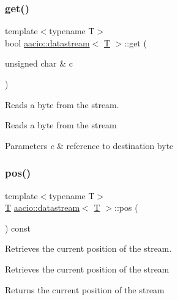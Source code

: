 \subsubsection{\texorpdfstring{get()}{get()}}
{\footnotesize\ttfamily template$<$typename T$>$ \\
bool \mbox{\hyperlink{classaacio_1_1datastream}{aacio\+::datastream}}$<$ \mbox{\hyperlink{struct_t}{T}} $>$\+::get (\begin{DoxyParamCaption}\item[{unsigned char \&}]{c }\end{DoxyParamCaption})\hspace{0.3cm}{\ttfamily [inline]}}



Reads a byte from the stream. 

Reads a byte from the stream 
\begin{DoxyParams}{Parameters}
{\em c} & reference to destination byte \\
\hline
\end{DoxyParams}
\mbox{\label{classaacio_1_1datastream_a8870b1737d81ad372b45f1a2f097d119}} 
\subsubsection{\texorpdfstring{pos()}{pos()}}
{\footnotesize\ttfamily template$<$typename T$>$ \\
\mbox{\hyperlink{struct_t}{T}} \mbox{\hyperlink{classaacio_1_1datastream}{aacio\+::datastream}}$<$ \mbox{\hyperlink{struct_t}{T}} $>$\+::pos (\begin{DoxyParamCaption}{ }\end{DoxyParamCaption}) const\hspace{0.3cm}{\ttfamily [inline]}}



Retrieves the current position of the stream. 

Retrieves the current position of the stream \begin{DoxyReturn}{Returns}
the current position of the stream 
\end{DoxyReturn}
\mbox{\label{classaacio_1_1datastream_aae43a09979f5e484a02d86b8a17a2587}} 
